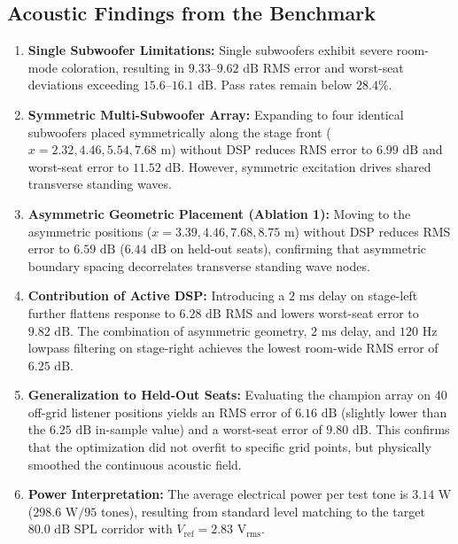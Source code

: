 \documentclass[11pt,a4paper]{article}
\begin{document}
\subsection{Acoustic Findings from the Benchmark}
\begin{enumerate}
    \item \textbf{Single Subwoofer Limitations:} Single subwoofers exhibit severe room-mode coloration, resulting in $9.33\text{--}9.62\text{ dB}$ RMS error and worst-seat deviations exceeding $15.6\text{--}16.1\text{ dB}$. Pass rates remain below $28.4\%$.
    \item \textbf{Symmetric Multi-Subwoofer Array:} Expanding to four identical subwoofers placed symmetrically along the stage front ($x = 2.32, 4.46, 5.54, 7.68\text{ m}$) without DSP reduces RMS error to $6.99\text{ dB}$ and worst-seat error to $11.52\text{ dB}$. However, symmetric excitation drives shared transverse standing waves.
    \item \textbf{Asymmetric Geometric Placement (Ablation 1):} Moving to the asymmetric positions ($x = 3.39, 4.46, 7.68, 8.75\text{ m}$) without DSP reduces RMS error to $6.59\text{ dB}$ ($6.44\text{ dB}$ on held-out seats), confirming that asymmetric boundary spacing decorrelates transverse standing wave nodes.
    \item \textbf{Contribution of Active DSP:} Introducing a $2\text{ ms}$ delay on stage-left further flattens response to $6.28\text{ dB}$ RMS and lowers worst-seat error to $9.82\text{ dB}$. The combination of asymmetric geometry, $2\text{ ms}$ delay, and $120\text{ Hz}$ lowpass filtering on stage-right achieves the lowest room-wide RMS error of $6.25\text{ dB}$.
    \item \textbf{Generalization to Held-Out Seats:} Evaluating the champion array on 40 off-grid listener positions yields an RMS error of $6.16\text{ dB}$ (slightly lower than the $6.25\text{ dB}$ in-sample value) and a worst-seat error of $9.80\text{ dB}$. This confirms that the optimization did not overfit to specific grid points, but physically smoothed the continuous acoustic field.
    \item \textbf{Power Interpretation:} The average electrical power per test tone is $3.14\text{ W}$ ($298.6\text{ W} / 95\text{ tones}$), resulting from standard level matching to the target $80.0\text{ dB SPL}$ corridor with $V_{\text{ref}} = 2.83\text{ V}_{\text{rms}}$.
\end{enumerate}
\end{document}
